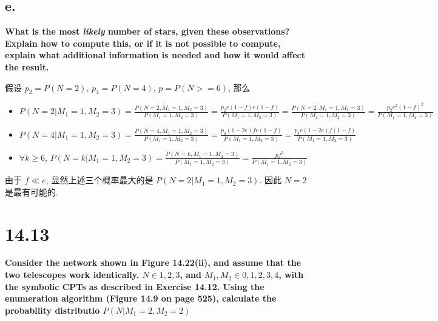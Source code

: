 \documentclass[UTF8]{article}
\newcommand{\jumpLine} {\hspace*{\fill} \par}
\begin{document}
\subsection*{e.}
\noindent \textbf{What is the most \textit{likely} number of stars, given these observations? Explain how to compute this, or if it is not possible to compute, explain what additional information is needed and how it would affect the result.} \\\jumpLine\noindent
假设 $p_2=P(N=2)$, $p_4=P(N=4)$, $p=P(N>=6)$, 那么
\begin{itemize}
	\item $P(N=2|M_1=1,M_2=3)
	=\frac{P(N=2,M_1=1,M_2=3)}{P(M_1=1, M_2=3)}
	=\frac{p_2e(1-f)e(1-f)}{P(M_1=1, M_2=3)}=\frac{P(N=2,M_1=1,M_2=3)}{P(M_1=1, M_2=3)}
	=\frac{p_2e^2(1-f)^2}{P(M_1=1, M_2=3)}$
	\item $P(N=4|M_1=1,M_2=3)
	=\frac{P(N=4,M_1=1,M_2=3)}{P(M_1=1, M_2=3)}
	=\frac{p_4(1-2e)fe(1-f)}{P(M_1=1, M_2=3)}
	=\frac{p_4e(1-2e)f(1-f)}{P(M_1=1, M_2=3)}$
	\item $\forall k \ge 6$, 
	$P(N=k|M_1=1,M_2=3)
	=\frac{P(N=k,M_1=1,M_2=3)}{P(M_1=1, M_2=3)}
	=\frac{pf^2}{P(M_1=1, M_2=3)}$
\end{itemize}
由于 $f\ll e$, 显然上述三个概率最大的是 $P(N=2|M_1=1,M_2=3)$. 因此 $N=2$ 是最有可能的.

\section*{14.13}
\noindent \textbf{Consider the network shown in Figure 14.22(ii), and assume that the two telescopes work identically. $N\in 1,2,3$, and $M_1,M_2\in 0,1,2,3,4$, with the symbolic CPTs as described in Exercise 14.12. Using the enumeration algorithm (Figure 14.9 on page 525), calculate the probability distributio $P(N|M_1=2,M_2=2)$}
\end{document}

